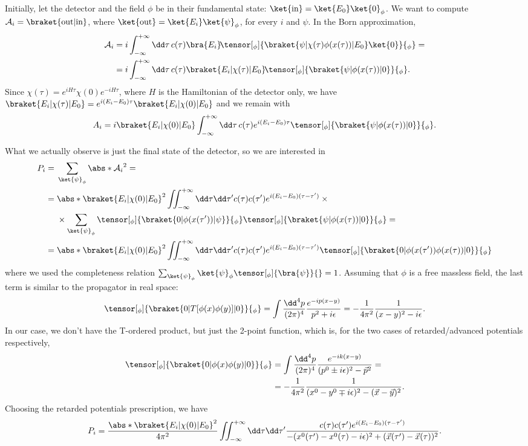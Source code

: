 \documentclass[a4paper,12pt]{book}
\begin{document}
Initially, let the detector and the field $\phi$ be in their fundamental state: $\ket{\text{in}}=\ket{E_0}\ket{0}_\phi$. We want to compute $\mathcal A_i=\braket{\text{out}|\text{in}}$, where $\ket{\text{out}}=\ket{E_i}\ket{\psi}_\phi$, for every $i$ and $\psi$. In the Born approximation,
\begin{align*}
\mathcal A_i&=i\int_{-\infty}^{+\infty}\dd\tau\,c(\tau) \bra{E_i}\!\tensor[_\phi]{\braket{\psi|\chi(\tau)\phi(x(\tau))|E_0}\ket{0}}{_\phi}=\\
&=i\int_{-\infty}^{+\infty}\dd\tau\,c(\tau)\braket{E_i|\chi(\tau)|E_0}\!\tensor[_\phi]{\braket{\psi|\phi(x(\tau))|0}}{_\phi}.
\end{align*}
Since $\chi(\tau)=e^{iH\tau}\chi(0)e^{-iH\tau}$, where $H$ is the Hamiltonian of the detector only, we have $\braket{E_i|\chi(\tau)|E_0}=e^{i(E_i-E_0)\tau}\braket{E_i|\chi(0)|E_0}$ and we remain with
\[A_i=i\braket{E_i|\chi(0)|E_0}\int_{-\infty}^{+\infty}\dd\tau\,c(\tau)e^{i(E_i-E_0)\tau}\tensor[_\phi]{\braket{\psi|\phi(x(\tau))|0}}{_\phi}.\]

What we actually observe is just the final state of the detector, so we are interested in
\begin{align*}
P_i={}&\sum_{\ket{\psi}_\phi}\abs*{\mathcal A_i}^2=\\
={}&\abs*{\braket{E_i|\chi(0)|E_0}}^2\iint_{-\infty}^{+\infty}\dd\tau\dd\tau'c(\tau)c(\tau')e^{i(E_i-E_0)(\tau-\tau')}\times{}\\
&\times\sum_{\ket{\psi}_\phi}\tensor[_\phi]{\braket{0|\phi(x(\tau'))|\psi}}{_\phi}\tensor[_\phi]{\braket{\psi|\phi(x(\tau))|0}}{_\phi}=\\
={}&\abs*{\braket{E_i|\chi(0)|E_0}}^2\iint_{-\infty}^{+\infty}\dd\tau\dd\tau'c(\tau)c(\tau')e^{i(E_i-E_0)(\tau-\tau')}\tensor[_\phi]{\braket{0|\phi(x(\tau'))\phi(x(\tau))|0}}{_\phi}
\end{align*}
where we used the completeness relation $\sum_{\ket{\psi}_\phi}\ket{\psi}_\phi\tensor[_\phi]{\bra{\psi}}{}=1$. Assuming that $\phi$ is a free massless field, the last term is similar to the propagator in real space:
\[\tensor[_\phi]{\braket{0|T[\phi(x)\phi(y)]|0}}{_\phi}=\int\frac{\dd^4p}{(2\pi)^4}\frac{e^{-ip(x-y)}}{p^2+i\epsilon}=-\frac1{4\pi^2}\frac1{(x-y)^2-i\epsilon}.\]
In our case, we don't have the T-ordered product, but just the 2-point function, which is, for the two cases of retarded/advanced potentials respectively,
\begin{align*}
\tensor[_\phi]{\braket{0|\phi(x)\phi(y)|0}}{_\phi}&=\int\frac{\dd^4p}{(2\pi)^4}\frac{e^{-ik(x-y)}}{(p^0\pm i\epsilon)^2-\vec p^2}=\\
&=-\frac1{4\pi^2}\frac1{(x^0-y^0\mp i\epsilon)^2-(\vec x-\vec y)^2}.
\end{align*}
Choosing the retarded potentials prescription, we have
\[P_i=\frac{\abs*{\braket{E_i|\chi(0)|E_0}}^2}{4\pi^2}\iint_{-\infty}^{+\infty}\dd\tau\dd\tau'\frac{c(\tau)c(\tau')e^{i(E_i-E_0)(\tau-\tau')}}{-(x^0(\tau')-x^0(\tau)-i\epsilon)^2+(\vec x(\tau')-\vec x(\tau))^2}.\]
\end{document}
